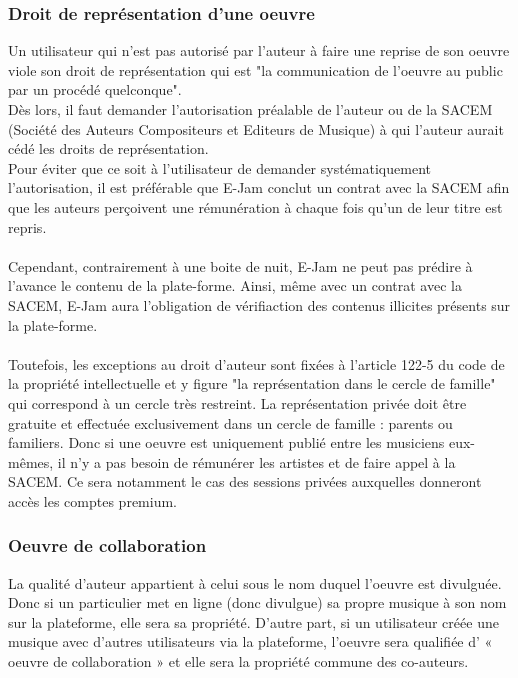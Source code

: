 \documentclass[a4,12pt]{article}
\begin{document}
\subsubsection{Droit de représentation d'une oeuvre}
Un utilisateur qui n'est pas autorisé par l'auteur à faire une reprise de son oeuvre viole son droit de représentation qui est "la communication de l'oeuvre au public par un procédé quelconque".\\
Dès lors, il faut demander l'autorisation préalable de l'auteur ou de la SACEM (Société des Auteurs Compositeurs et Editeurs de Musique) à qui l'auteur aurait cédé les droits de représentation.\\
Pour éviter que ce soit à l'utilisateur de demander systématiquement l'autorisation, il est préférable que E-Jam conclut un contrat avec la SACEM afin que les auteurs perçoivent une rémunération à chaque fois qu'un de leur titre est repris.\\
\\
Cependant, contrairement à une boite de nuit, E-Jam ne peut pas prédire à l'avance le contenu de la plate-forme. Ainsi, même avec un contrat avec la SACEM, E-Jam aura l'obligation de vérifiaction des contenus illicites présents sur la plate-forme.\\
\\
Toutefois, les exceptions au droit d'auteur sont fixées à l'article 122-5 du code de la propriété intellectuelle et y figure "la représentation dans le cercle de famille" qui correspond à un cercle très restreint. La représentation privée doit être gratuite et effectuée exclusivement dans un cercle de famille : parents ou familiers. Donc si une oeuvre est uniquement publié entre les musiciens eux-mêmes, il n'y a pas besoin de rémunérer les artistes et de faire appel à la SACEM. Ce sera notamment le cas des sessions privées auxquelles donneront accès les comptes premium.
\subsubsection{Oeuvre de collaboration}
La qualité d’auteur appartient à celui sous le nom duquel l’oeuvre est divulguée.\\
Donc si un particulier met en ligne (donc divulgue) sa propre musique à son nom sur la plateforme, elle sera sa propriété. D’autre part, si un utilisateur créée une musique avec d’autres utilisateurs via la plateforme, l’oeuvre sera qualifiée d’ « oeuvre de collaboration » et elle sera la propriété commune des co-auteurs.
\end{document}

